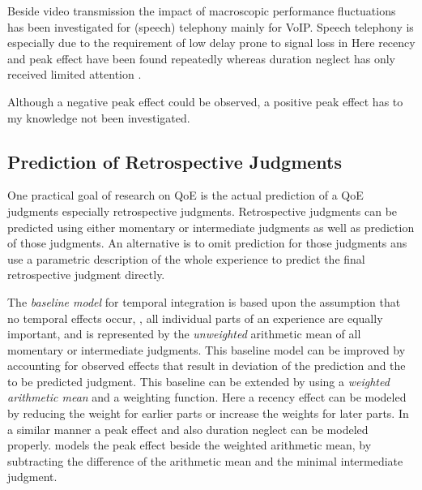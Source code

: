 Beside video transmission the impact of macroscopic performance fluctuations has been investigated for (speech) telephony mainly for \ac{VoIP}.
Speech telephony is especially due to the requirement of low delay prone to signal loss in 
Here recency and peak effect have been found repeatedly \citep[\cf,][]{rosenbluth_testing_1998, hamberg_time-varying_1999, gros_instantaneous_2001, gros_effects_2004, belmudez_assessment_2014, weiss_modeling_2009, lewcio_management_2012} whereas duration neglect has only received limited attention \citep[\cf,][]{rosenbluth_testing_1998}.

Although a negative peak effect could be observed, a positive peak effect has to my knowledge not been investigated.

\subsection{Prediction of Retrospective Judgments}
One practical goal of research on \ac{QoE} is the actual prediction of a \ac{QoE} judgments especially retrospective judgments.
Retrospective judgments can be predicted using either momentary or intermediate judgments as well as prediction of those judgments.
An alternative is to omit prediction for those judgments ans use a parametric description of the whole experience to predict the final retrospective judgment directly.

The \emph{baseline model} for temporal integration is based upon the assumption that no temporal effects occur, \ie, all individual parts of an experience are equally important, and is represented by the \emph{unweighted} arithmetic mean of all momentary or intermediate judgments.
This baseline model can be improved by accounting for observed effects that result in deviation of the prediction and the to be predicted judgment.
This baseline can be extended by using a \emph{weighted arithmetic mean} and a weighting function.
Here a recency effect can be modeled by reducing the weight for earlier parts \citep[\cf,][]{rosenbluth_testing_1998, weiss_modeling_2009, hamberg_time-varying_1999} or increase the weights for later parts.
In a similar manner a peak effect and also duration neglect can be modeled properly.
\cite{weiss_modeling_2009} models the peak effect beside the weighted arithmetic mean, by subtracting the difference of the arithmetic mean and the minimal intermediate judgment.

